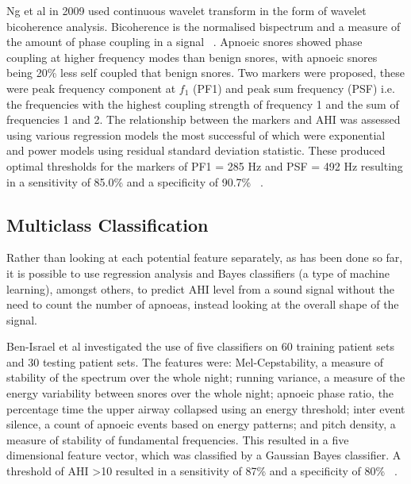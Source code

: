 Ng et al in 2009 used continuous wavelet transform in the form of wavelet bicoherence analysis. Bicoherence is the normalised bispectrum and a measure of the amount of phase coupling in a signal ~\cite{van1995wavelet}. Apnoeic snores showed phase coupling at higher frequency modes than benign snores, with apnoeic snores being 20\% less self coupled that benign snores. Two markers were proposed, these were peak frequency component at $f_1$ (PF1) and peak sum frequency (PSF) i.e. the frequencies with the highest coupling strength of frequency 1 and the sum of frequencies 1 and 2. The relationship between the markers and AHI was assessed using various regression models the most successful of which were exponential and power models using residual standard deviation statistic. These produced optimal thresholds for the markers of PF1 = 285 Hz and PSF = 492 Hz resulting in a sensitivity of 85.0\% and a specificity of 90.7\% ~\cite{ng2009investigation}.

\subsection{Multiclass Classification}
Rather than looking at each potential feature separately, as has been done so far, it is possible to use regression analysis and Bayes classifiers (a type of machine learning), amongst others, to predict AHI level from a sound signal without  the need to count the number of apnoeas, instead looking at the overall shape of the signal.

Ben-Israel et al investigated the use of five classifiers on 60 training patient sets and 30 testing patient sets. The features were: Mel-Cepstability, a measure of stability of the spectrum over the whole night; running variance, a measure of the energy variability between snores over the whole night; apnoeic phase ratio, the percentage time the upper airway collapsed using an energy threshold; inter event silence, a count of apnoeic events based on energy patterns; and pitch density, a measure of stability of fundamental frequencies. This resulted in a five dimensional feature vector, which was classified by a Gaussian Bayes classifier. A threshold of AHI \textgreater 10 resulted in a sensitivity of 87\% and a specificity of 80\% ~\cite{ben2012obstructive}.

